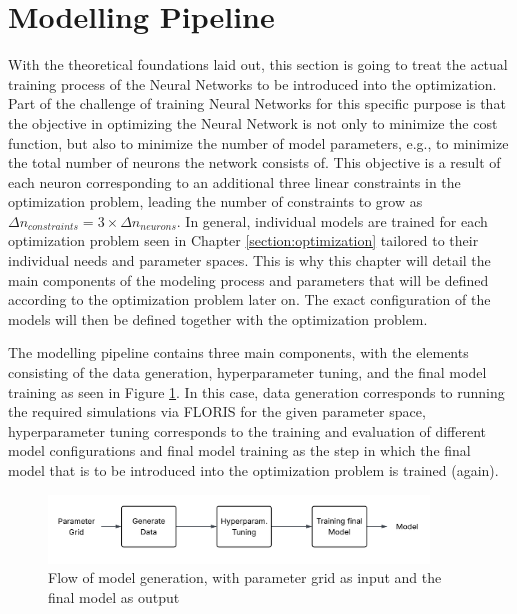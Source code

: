 \section{Modelling Pipeline} \label{sec:model_pipe}

With the theoretical foundations laid out, this section is going to treat the actual training process of the Neural Networks to be introduced into the optimization. Part of the challenge of training Neural Networks for this specific purpose is that the objective in optimizing the Neural Network is not only to minimize the cost function, but also to minimize the  number of model parameters, e.g., to minimize the total number of neurons the network consists of. This objective is a result of each neuron corresponding to an additional three linear constraints in the optimization problem, leading the number of constraints to grow as $\Delta n_{constraints} =3 \times \Delta n_{neurons}$. In general, individual models are trained for each optimization problem seen in Chapter \ref{section:optimization} tailored to their individual needs and parameter spaces. This is why this chapter will detail the main components of the modeling process and parameters that will be defined according to the optimization problem later on. The exact configuration of the models will then be defined together with the optimization problem.  

The modelling pipeline contains three main components, with the elements consisting of the data generation, hyperparameter tuning, and the final model training as seen in Figure \ref{fig:model_flow}. In this case, data generation corresponds to running the required simulations via FLORIS  for the given parameter space, hyperparameter tuning corresponds to the training and evaluation of different model configurations and final model training as the step in which the final model that is to be introduced into the optimization problem is trained (again).


\begin{figure}[h] 
	\centering
	\includegraphics[width=0.9\textwidth]{../figures/modelling/model_flow.png} 
	\caption{Flow of model generation, with parameter grid as input and the final model as output}
	\label{fig:model_flow}
\end{figure}

